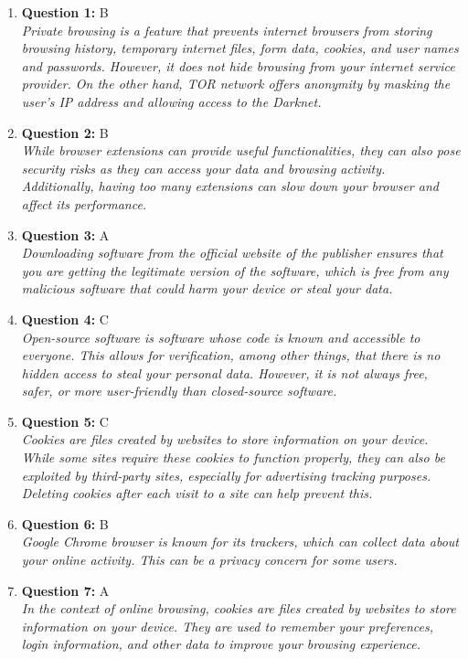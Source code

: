\documentclass[12pt,a4paper]{article}
\begin{document}
\begin{enumerate}
\item \textbf{Question 1:} B
\\ \textit{Private browsing is a feature that prevents internet
browsers from storing browsing history, temporary internet
files, form data, cookies, and user names and passwords.
However, it does not hide browsing from your internet
service provider. On the other hand, TOR network offers
anonymity by masking the user's IP address and allowing
access to the Darknet.}

\item \textbf{Question 2:} B
\\ \textit{While browser extensions can provide useful
functionalities, they can also pose security risks as they
can access your data and browsing activity. Additionally,
having too many extensions can slow down your browser and
affect its performance.}

\item \textbf{Question 3:} A
\\ \textit{Downloading software from the official website of the
publisher ensures that you are getting the legitimate
version of the software, which is free from any malicious
software that could harm your device or steal your data.}

\item \textbf{Question 4:} C
\\ \textit{Open-source software is software whose code is known and
accessible to everyone. This allows for verification, among
other things, that there is no hidden access to steal your
personal data. However, it is not always free, safer, or
more user-friendly than closed-source software.}

\item \textbf{Question 5:} C
\\ \textit{Cookies are files created by websites to store information
on your device. While some sites require these cookies to
function properly, they can also be exploited by
third-party sites, especially for advertising tracking
purposes. Deleting cookies after each visit to a site can
help prevent this.}

\item \textbf{Question 6:} B
\\ \textit{Google Chrome browser is known for its trackers, which can
collect data about your online activity. This can be a
privacy concern for some users.}

\item \textbf{Question 7:} A
\\ \textit{In the context of online browsing, cookies are files
created by websites to store information on your device.
They are used to remember your preferences, login
information, and other data to improve your browsing
experience.}


\end{enumerate}
\end{document}
